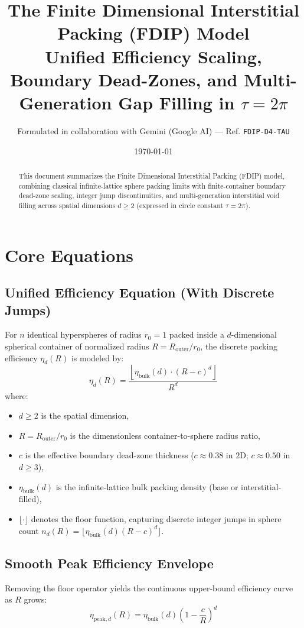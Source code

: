 \documentclass[11pt,a4paper]{article}
\title{\textbf{The Finite Dimensional Interstitial Packing (FDIP) Model}\\
\large Unified Efficiency Scaling, Boundary Dead-Zones, and Multi-Generation Gap Filling in $\tau = 2\pi$}
\author{Formulated in collaboration with Gemini (Google AI) --- Ref. \texttt{FDIP-D4-TAU}}
\date{\today}
\begin{document}
\maketitle

\begin{abstract}
This document summarizes the Finite Dimensional Interstitial Packing (FDIP) model, combining classical infinite-lattice sphere packing limits with finite-container boundary dead-zone scaling, integer jump discontinuities, and multi-generation interstitial void filling across spatial dimensions $d \ge 2$ (expressed in circle constant $\tau = 2\pi$).
\end{abstract}

\section{Core Equations}

\subsection{Unified Efficiency Equation (With Discrete Jumps)}
For $n$ identical hyperspheres of radius $r_0 = 1$ packed inside a $d$-dimensional spherical container of normalized radius $R = R_{\mathrm{outer}}/r_0$, the discrete packing efficiency $\eta_d(R)$ is modeled by:
\begin{equation}
\eta_d(R) = \frac{\left\lfloor \eta_{\mathrm{bulk}}(d) \cdot (R - c)^d \right\rfloor}{R^d}
\end{equation}
where:
\begin{itemize}
    \item $d \ge 2$ is the spatial dimension,
    \item $R = R_{\mathrm{outer}}/r_0$ is the dimensionless container-to-sphere radius ratio,
    \item $c$ is the effective boundary dead-zone thickness ($c \approx 0.38$ in $2\mathrm{D}$; $c \approx 0.50$ in $d \ge 3$),
    \item $\eta_{\mathrm{bulk}}(d)$ is the infinite-lattice bulk packing density (base or interstitial-filled),
    \item $\lfloor \cdot \rfloor$ denotes the floor function, capturing discrete integer jumps in sphere count $n_d(R) = \lfloor \eta_{\mathrm{bulk}}(d)(R - c)^d \rfloor$.
\end{itemize}

\subsection{Smooth Peak Efficiency Envelope}
Removing the floor operator yields the continuous upper-bound efficiency curve as $R$ grows:
\begin{equation}
\eta_{\mathrm{peak}, d}(R) = \eta_{\mathrm{bulk}}(d)\left(1 - \frac{c}{R}\right)^d
\end{equation}
\end{document}
